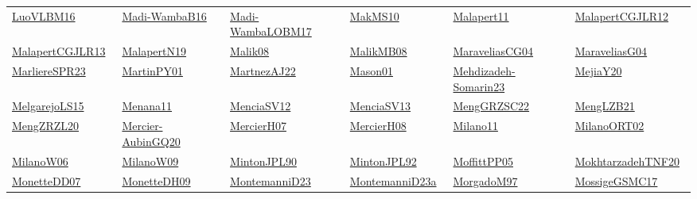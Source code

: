\begin{longtable}{*{6}{l}}
\href{../works/LuoVLBM16.pdf}{LuoVLBM16}~\cite{LuoVLBM16} & \href{../works/Madi-WambaB16.pdf}{Madi-WambaB16}~\cite{Madi-WambaB16} & \href{../works/Madi-WambaLOBM17.pdf}{Madi-WambaLOBM17}~\cite{Madi-WambaLOBM17} & \href{../works/MakMS10.pdf}{MakMS10}~\cite{MakMS10} & \href{../works/Malapert11.pdf}{Malapert11}~\cite{Malapert11} & \href{../works/MalapertCGJLR12.pdf}{MalapertCGJLR12}~\cite{MalapertCGJLR12}\\ 
\href{../works/MalapertCGJLR13.pdf}{MalapertCGJLR13}~\cite{MalapertCGJLR13} & \href{../works/MalapertN19.pdf}{MalapertN19}~\cite{MalapertN19} & \href{../works/Malik08.pdf}{Malik08}~\cite{Malik08} & \href{../works/MalikMB08.pdf}{MalikMB08}~\cite{MalikMB08} & \href{../works/MaraveliasCG04.pdf}{MaraveliasCG04}~\cite{MaraveliasCG04} & \href{../works/MaraveliasG04.pdf}{MaraveliasG04}~\cite{MaraveliasG04}\\ 
\href{../works/MarliereSPR23.pdf}{MarliereSPR23}~\cite{MarliereSPR23} & \href{../works/MartinPY01.pdf}{MartinPY01}~\cite{MartinPY01} & \href{../}{MartnezAJ22}~\cite{MartnezAJ22} & \href{../works/Mason01.pdf}{Mason01}~\cite{Mason01} & \href{../works/Mehdizadeh-Somarin23.pdf}{Mehdizadeh-Somarin23}~\cite{Mehdizadeh-Somarin23} & \href{../works/MejiaY20.pdf}{MejiaY20}~\cite{MejiaY20}\\ 
\href{../works/MelgarejoLS15.pdf}{MelgarejoLS15}~\cite{MelgarejoLS15} & \href{../works/Menana11.pdf}{Menana11}~\cite{Menana11} & \href{../works/MenciaSV12.pdf}{MenciaSV12}~\cite{MenciaSV12} & \href{../works/MenciaSV13.pdf}{MenciaSV13}~\cite{MenciaSV13} & \href{../works/MengGRZSC22.pdf}{MengGRZSC22}~\cite{MengGRZSC22} & \href{../works/MengLZB21.pdf}{MengLZB21}~\cite{MengLZB21}\\ 
\href{../works/MengZRZL20.pdf}{MengZRZL20}~\cite{MengZRZL20} & \href{../works/Mercier-AubinGQ20.pdf}{Mercier-AubinGQ20}~\cite{Mercier-AubinGQ20} & \href{../works/MercierH07.pdf}{MercierH07}~\cite{MercierH07} & \href{../works/MercierH08.pdf}{MercierH08}~\cite{MercierH08} & \href{../}{Milano11}~\cite{Milano11} & \href{../}{MilanoORT02}~\cite{MilanoORT02}\\ 
\href{../works/MilanoW06.pdf}{MilanoW06}~\cite{MilanoW06} & \href{../works/MilanoW09.pdf}{MilanoW09}~\cite{MilanoW09} & \href{../works/MintonJPL90.pdf}{MintonJPL90}~\cite{MintonJPL90} & \href{../}{MintonJPL92}~\cite{MintonJPL92} & \href{../works/MoffittPP05.pdf}{MoffittPP05}~\cite{MoffittPP05} & \href{../works/MokhtarzadehTNF20.pdf}{MokhtarzadehTNF20}~\cite{MokhtarzadehTNF20}\\ 
\href{../works/MonetteDD07.pdf}{MonetteDD07}~\cite{MonetteDD07} & \href{../works/MonetteDH09.pdf}{MonetteDH09}~\cite{MonetteDH09} & \href{../works/MontemanniD23.pdf}{MontemanniD23}~\cite{MontemanniD23} & \href{../works/MontemanniD23a.pdf}{MontemanniD23a}~\cite{MontemanniD23a} & \href{../works/MorgadoM97.pdf}{MorgadoM97}~\cite{MorgadoM97} & \href{../works/MossigeGSMC17.pdf}{MossigeGSMC17}~\cite{MossigeGSMC17}\\ 

\end{longtable}
